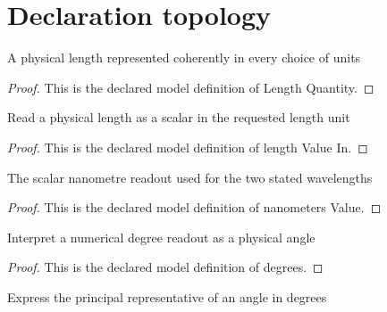 \section{Declaration topology}
\begin{definition}
  \label{def:physics:phyx-mini-0150:phyxminiproblems-problemphyxmini0150-lengthquantity}
  A physical length represented coherently in every choice of units
\end{definition}
\begin{proof}
  This is the declared model definition of Length Quantity.
\end{proof}
\begin{definition}
  \label{def:physics:phyx-mini-0150:phyxminiproblems-problemphyxmini0150-lengthvaluein}
  Read a physical length as a scalar in the requested length unit
\end{definition}
\begin{proof}
  This is the declared model definition of length Value In.
\end{proof}
\begin{definition}
  \label{def:physics:phyx-mini-0150:phyxminiproblems-problemphyxmini0150-nanometersvalue}
  The scalar nanometre readout used for the two stated wavelengths
\end{definition}
\begin{proof}
  This is the declared model definition of nanometers Value.
\end{proof}
\begin{definition}[degrees]
  \label{def:physics:phyx-mini-0150:phyxminiproblems-problemphyxmini0150-degrees}
  Interpret a numerical degree readout as a physical angle
\end{definition}
\begin{proof}
  This is the declared model definition of degrees.
\end{proof}
\begin{definition}
  \label{def:physics:phyx-mini-0150:phyxminiproblems-problemphyxmini0150-degreereadout}
  Express the principal representative of an angle in degrees
\end{definition}
